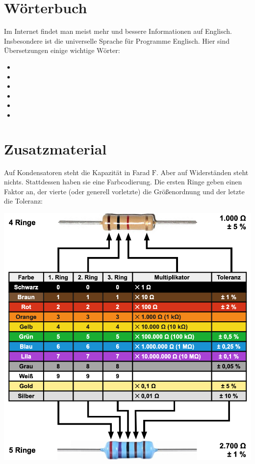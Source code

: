 \documentclass[a4paper,12pt]{book}
\begin{document}
\section*{Wörterbuch}
Im Internet findet man meist mehr und bessere Informationen auf Englisch.
Insbesondere ist die universelle Sprache für Programme Englisch.
Hier sind Übersetzungen einige wichtige Wörter:
\begin{itemize}
  \item {}
  \item {}
  \item {}
  \item {}
  \item {}
  \item {} %
\end{itemize}

\section*{Zusatzmaterial}
Auf Kondensatoren steht die Kapazität in Farad $\si{\farad}$.
Aber auf Widerständen steht nichts.
Stattdessen haben sie eine Farbcodierung.
Die ersten Ringe geben einen Faktor an, der vierte (oder generell vorletzte) die Größenordnung und der letzte die Toleranz:

\begin{center}
\includegraphics[width=.8\textwidth]{images/bauteil_widerstand_kennzeichnung.png}
\end{center}
\end{document}
